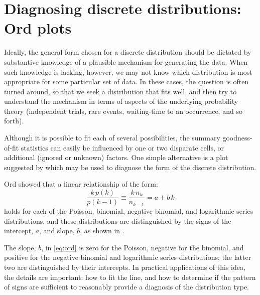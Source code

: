 \documentclass[10pt,krantz2]{krantz}\usepackage[]{graphicx}\usepackage[]{color}
\begin{document}

\section{Diagnosing discrete distributions: Ord plots}\label{sec:discrete-ord}

Ideally, the general form chosen for a discrete distribution should
be dictated by substantive knowledge of a plausible mechanism
for generating the data.
When such knowledge is lacking, however,
we may not know which distribution is most appropriate for
some particular set of data.
In these cases, the question is often turned around, so that we seek
a distribution that fits well, and then try to understand the mechanism
in terms of aspects of the underlying probability theory (independent trials,
rare events, waiting-time to an occurrence, and so forth).

Although it is possible to fit each of several possibilities,
the summary goodness-of-fit statistics can easily be influenced by
one or two disparate cells, or additional (ignored or unknown) factors.
One simple alternative is a plot suggested by
\citet{Ord:67} which may be used to diagnose
the form of the discrete distribution.

Ord showed that a linear
relationship of the form:
\begin{equation} \label{eq:ord}
  \frac{ k \,  p(k) } { p(k-1) }
\equiv \frac{ k \,  n_k } { n_{k-1} }
 = a  +  b \, k 
\end{equation}
holds for each of the Poisson, binomial, negative binomial, and
logarithmic series distributions, and these distributions are
distinguished by the signs of the intercept,
$a$, and slope, $b$, as shown in
.


The slope, \(b\),
in \eqref{eq:ord} is zero for the
Poisson, negative for the binomial, and positive for the negative
binomial and logarithmic series distributions; the latter two are
distinguished by their intercepts. In practical applications of this
idea, the details are important:  how to fit the line, and how to determine
if the pattern of signs are sufficient to reasonably provide a
diagnosis of the distribution type.
\end{document}

